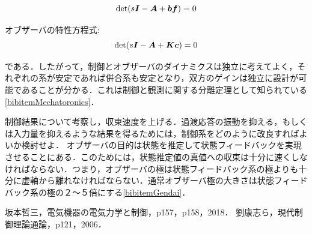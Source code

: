 \documentclass[12pt]{jsarticle}
\begin{document}
\begin{description}
\begin{description}
    \begin{equation}
      {\rm det}(s{\bm I} - {\bm A} + {\bm b}{\bm f}) = 0
    \end{equation}
    \item オブザーバの特性方程式:
    \begin{equation}
      {\rm det}(s{\bm I} - {\bm A} + {\bm K}{\bm c}) = 0
    \end{equation}
  \end{description}
である．したがって，制御とオブザーバのダイナミクスは独立に考えてよく，それぞれの系が安定であれば併合系も安定となり，双方のゲインは独立に設計が可能であることが分かる．これは制御と観測に関する分離定理として知られている\ref{bibitemMechatoronics}．

  \item[(2)] 制御結果について考察し，収束速度を上げる．過渡応答の振動を抑える，もしくは入力量を抑えるような結果を得るためには，制御系をどのように改良すればよいか検討せよ．
  オブザーバの目的は状態を推定して状態フィードバックを実現させることにある．このためには，状態推定値の真値への収束は十分に速くしなければならない．つまり，オブザーバの極は状態フィードバック系の極よりも十分に虚軸から離れなければならない．通常オブザーバ極の大きさは状態フィードバック系の極の２〜５倍にする\ref{bibitemGendai}．
\end{description}

\begin{thebibliography}{9}
   坂本哲三，電気機器の電気力学と制御，p157，p158，2018．
   劉康志ら，現代制御理論通論，p121，2006．
\end{thebibliography}
\end{document}
